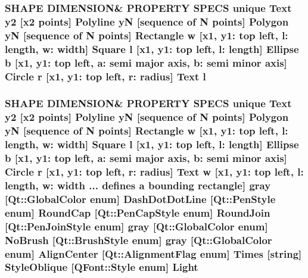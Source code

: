 \subsubsection[{\texorpdfstring{l}{l}}]{\setlength{\rightskip}{0pt plus 5cm}S\+H\+A\+PE D\+I\+M\+E\+N\+S\+I\+ON\& P\+R\+O\+P\+E\+R\+TY S\+P\+E\+CS unique {\bf Text} {\bf y2} \mbox{[}{\bf x2} points\mbox{]} {\bf Polyline} yN \mbox{[}sequence of N points\mbox{]} {\bf Polygon} yN \mbox{[}sequence of N points\mbox{]} {\bf Rectangle} w \mbox{[}{\bf x1}, y1\+: top left, l\+: length, w\+: width\mbox{]} {\bf Square} l \mbox{[}{\bf x1}, y1\+: top left, l\+: length\mbox{]} {\bf Ellipse} b \mbox{[}{\bf x1}, y1\+: top left, a\+: semi major axis, b\+: semi minor axis\mbox{]} {\bf Circle} r \mbox{[}{\bf x1}, y1\+: top left, r\+: radius\mbox{]} {\bf Text} l}\hypertarget{shape__input__file__specs_8txt_a2e02238fe11bc76d2a69c565c7391545}{}\label{shape__input__file__specs_8txt_a2e02238fe11bc76d2a69c565c7391545}
\subsubsection[{\texorpdfstring{Light}{Light}}]{\setlength{\rightskip}{0pt plus 5cm}S\+H\+A\+PE D\+I\+M\+E\+N\+S\+I\+ON\& P\+R\+O\+P\+E\+R\+TY S\+P\+E\+CS unique {\bf Text} {\bf y2} \mbox{[}{\bf x2} points\mbox{]} {\bf Polyline} yN \mbox{[}sequence of N points\mbox{]} {\bf Polygon} yN \mbox{[}sequence of N points\mbox{]} {\bf Rectangle} w \mbox{[}{\bf x1}, y1\+: top left, l\+: length, w\+: width\mbox{]} {\bf Square} {\bf l} \mbox{[}{\bf x1}, y1\+: top left, l\+: length\mbox{]} {\bf Ellipse} b \mbox{[}{\bf x1}, y1\+: top left, a\+: semi major axis, b\+: semi minor axis\mbox{]} {\bf Circle} r \mbox{[}{\bf x1}, y1\+: top left, r\+: radius\mbox{]} {\bf Text} w \mbox{[}{\bf x1}, y1\+: top left, l\+: length, w\+: width ... defines {\bf a} bounding rectangle\mbox{]} gray \mbox{[}Qt\+::\+Global\+Color enum\mbox{]} Dash\+Dot\+Dot\+Line \mbox{[}Qt\+::\+Pen\+Style enum\mbox{]} Round\+Cap \mbox{[}{\bf Qt\+::\+Pen\+Cap\+Style} enum\mbox{]} Round\+Join \mbox{[}{\bf Qt\+::\+Pen\+Join\+Style} enum\mbox{]} gray \mbox{[}Qt\+::\+Global\+Color enum\mbox{]} No\+Brush \mbox{[}{\bf Qt\+::\+Brush\+Style} enum\mbox{]} gray \mbox{[}Qt\+::\+Global\+Color enum\mbox{]} Align\+Center \mbox{[}Qt\+::\+Alignment\+Flag enum\mbox{]} Times \mbox{[}string\mbox{]} Style\+Oblique \mbox{[}Q\+Font\+::\+Style enum\mbox{]} Light}\hypertarget{shape__input__file__specs_8txt_a8326866c3d37167e950130bbd95d25ec}{}\label{shape__input__file__specs_8txt_a8326866c3d37167e950130bbd95d25ec}

